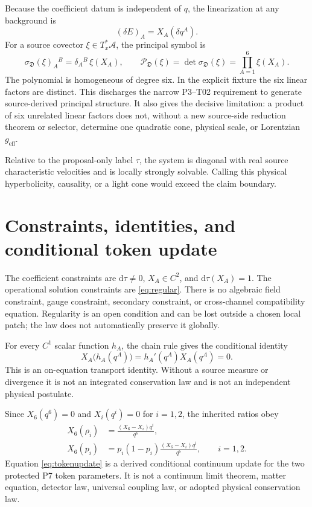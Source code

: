 \documentclass[11pt]{article}
\newcommand{\A}{\mathcal A}
\newcommand{\D}{\mathfrak D}
\newcommand{\dd}{\mathrm d}
\begin{document}
Because the coefficient datum is independent of $q$, the linearization at
any background is
\begin{equation}
  (\delta E)_A=X_A(\delta q^A).
  \label{eq:linearization}
\end{equation}
For a source covector $\xi\in T_x^*\A$, the principal symbol is
\begin{equation}
  \sigma_{\D}(\xi)_A{}^B
  =\delta_A{}^B\,\xi(X_A),
  \qquad
  \mathcal P_{\D}(\xi)
  =\det\sigma_{\D}(\xi)
  =\prod_{A=1}^{6}\xi(X_A).
  \label{eq:principal}
\end{equation}
The polynomial is homogeneous of degree six.  In the explicit fixture the six
linear factors are distinct.  This discharges the narrow P3--T02 requirement
to generate source-derived principal structure.  It also gives the decisive
limitation: a product of six unrelated linear factors does not, without a new
source-side reduction theorem or selector, determine one quadratic cone,
physical scale, or Lorentzian $g_{\mathrm{eff}}$.

Relative to the proposal-only label $\tau$, the system is diagonal with real
source characteristic velocities and is locally strongly solvable.  Calling
this physical hyperbolicity, causality, or a light cone would exceed the claim
boundary.

\section{Constraints, identities, and conditional token update}

The coefficient constraints are $\dd\tau\ne0$, $X_A\in C^2$, and
$\dd\tau(X_A)=1$.  The operational solution constraints are
\eqref{eq:regular}.  There is no algebraic field constraint, gauge constraint,
secondary constraint, or cross-channel compatibility equation.  Regularity
is an open condition and can be lost outside a chosen local patch; the law
does not automatically preserve it globally.

For every $C^1$ scalar function $h_A$, the chain rule gives the conditional
identity
\begin{equation}
  X_A\bigl(h_A(q^A)\bigr)=h_A'(q^A)X_A(q^A)=0.
  \label{eq:balance}
\end{equation}
This is an on-equation transport identity.  Without a source measure or
divergence it is not an integrated conservation law and is not an independent
physical postulate.

Since $X_6(q^6)=0$ and $X_i(q^i)=0$ for $i=1,2$, the inherited ratios obey
\begin{align}
 X_6(\rho_i)
 &=\frac{(X_6-X_i)q^i}{q^6},\nonumber\\
 X_6(p_i)
 &=p_i(1-p_i)\frac{(X_6-X_i)q^i}{q^6},
 \qquad i=1,2.
 \label{eq:tokenupdate}
\end{align}
Equation \eqref{eq:tokenupdate} is a derived conditional continuum update for
the two protected P7 token parameters.  It is not a continuum limit theorem,
matter equation, detector law, universal coupling law, or adopted physical
conservation law.
\end{document}

